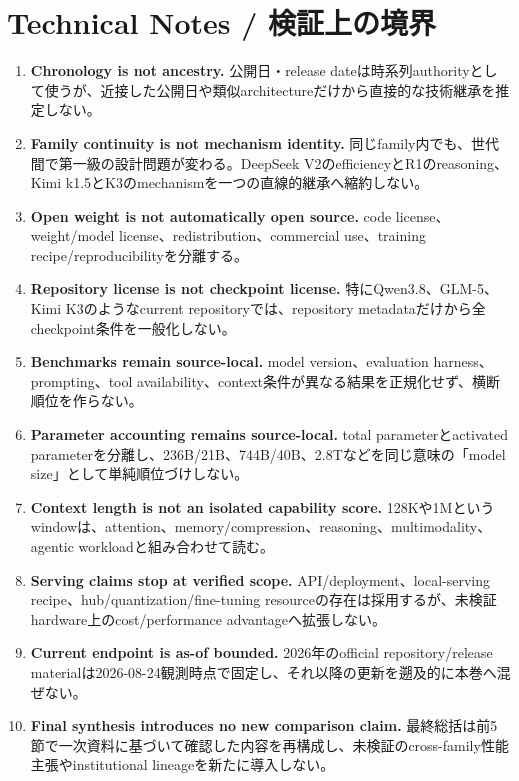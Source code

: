 \documentclass[lualatex,a4paper,10pt]{jlreq}
\begin{document}
\section*{Technical Notes / 検証上の境界}
\begin{enumerate}
  \item \textbf{Chronology is not ancestry.} 公開日・release dateは時系列authorityとして使うが、近接した公開日や類似architectureだけから直接的な技術継承を推定しない。
  \item \textbf{Family continuity is not mechanism identity.} 同じfamily内でも、世代間で第一級の設計問題が変わる。DeepSeek V2のefficiencyとR1のreasoning、Kimi k1.5とK3のmechanismを一つの直線的継承へ縮約しない。
  \item \textbf{Open weight is not automatically open source.} code license、weight/model license、redistribution、commercial use、training recipe/reproducibilityを分離する。
  \item \textbf{Repository license is not checkpoint license.} 特にQwen3.8、GLM-5、Kimi K3のようなcurrent repositoryでは、repository metadataだけから全checkpoint条件を一般化しない。
  \item \textbf{Benchmarks remain source-local.} model version、evaluation harness、prompting、tool availability、context条件が異なる結果を正規化せず、横断順位を作らない。
  \item \textbf{Parameter accounting remains source-local.} total parameterとactivated parameterを分離し、236B/21B、744B/40B、2.8Tなどを同じ意味の「model size」として単純順位づけしない。
  \item \textbf{Context length is not an isolated capability score.} 128Kや1Mというwindowは、attention、memory/compression、reasoning、multimodality、agentic workloadと組み合わせて読む。
  \item \textbf{Serving claims stop at verified scope.} API/deployment、local-serving recipe、hub/quantization/fine-tuning resourceの存在は採用するが、未検証hardware上のcost/performance advantageへ拡張しない。
  \item \textbf{Current endpoint is as-of bounded.} 2026年のofficial repository/release materialは2026-08-24観測時点で固定し、それ以降の更新を遡及的に本巻へ混ぜない。
  \item \textbf{Final synthesis introduces no new comparison claim.} 最終総括は前5節で一次資料に基づいて確認した内容を再構成し、未検証のcross-family性能主張やinstitutional lineageを新たに導入しない。
\end{enumerate}
\end{document}
